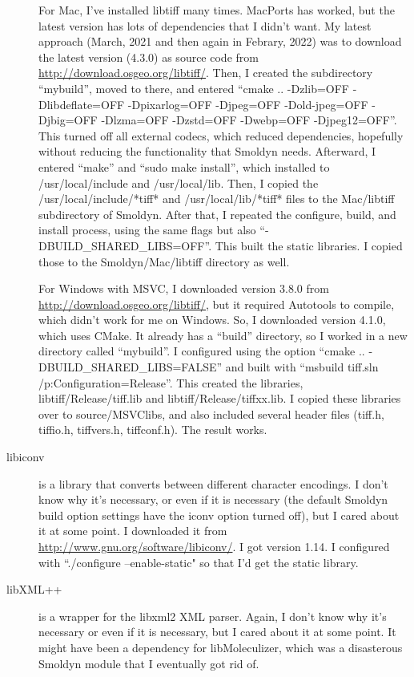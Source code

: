 \documentclass {scrbook}
\begin{document}
\begin{description}
For Mac, I've installed libtiff many times. MacPorts has worked, but the latest version has lots of dependencies that I didn't want. My latest approach (March, 2021 and then again in Febrary, 2022) was to download the latest version (4.3.0) as source code from \url{http://download.osgeo.org/libtiff/}. Then, I created the subdirectory ``mybuild'', moved to there, and entered ``cmake .. -Dzlib=OFF -Dlibdeflate=OFF -Dpixarlog=OFF -Djpeg=OFF -Dold-jpeg=OFF -Djbig=OFF -Dlzma=OFF -Dzstd=OFF -Dwebp=OFF -Djpeg12=OFF''. This turned off all external codecs, which reduced dependencies, hopefully without reducing the functionality that Smoldyn needs. Afterward, I entered ``make'' and ``sudo make install'', which installed to /usr/local/include and /usr/local/lib. Then, I copied the /usr/local/include/*tiff* and /usr/local/lib/*tiff* files to the Mac/libtiff subdirectory of Smoldyn. After that, I repeated the configure, build, and install process, using the same flags but also ``-DBUILD\_SHARED\_LIBS=OFF''. This built the static libraries. I copied those to the Smoldyn/Mac/libtiff directory as well.

For Windows with MSVC, I downloaded version 3.8.0 from \url{http://download.osgeo.org/libtiff/}, but it required Autotools to compile, which didn't work for me on Windows. So, I downloaded version 4.1.0, which uses CMake. It already has a ``build'' directory, so I worked in a new directory called ``mybuild''. I configured using the option ``cmake .. -DBUILD\_SHARED\_LIBS=FALSE'' and built with ``msbuild tiff.sln /p:Configuration=Release''. This created the libraries, libtiff/Release/tiff.lib and libtiff/Release/tiffxx.lib. I copied these libraries over to source/MSVClibs, and also included several header files (tiff.h, tiffio.h, tiffvers.h, tiffconf.h). The result works.

\item[libiconv] is a library that converts between different character encodings. I don't know why it's necessary, or even if it is necessary (the default Smoldyn build option settings have the iconv option turned off), but I cared about it at some point. I downloaded it from \url{http://www.gnu.org/software/libiconv/}. I got version 1.14. I configured with ``./configure --enable-static" so that I'd get the static library.

\item[libXML++] is a wrapper for the libxml2 XML parser. Again, I don't know why it's necessary or even if it is necessary, but I cared about it at some point. It might have been a dependency for libMoleculizer, which was a disasterous Smoldyn module that I eventually got rid of.


\end{description}
\end{document}
